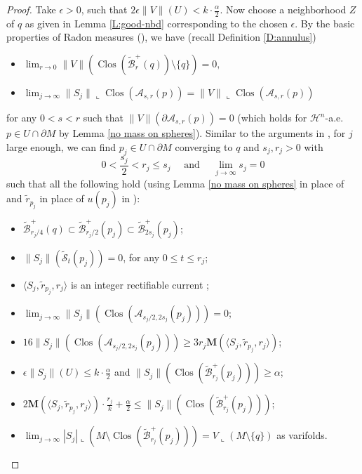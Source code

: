 \documentclass[10pt]{amsart}
\theoremstyle{definition}
\theoremstyle{remark}
\numberwithin{equation}{section}
\newcommand{\al}{\alpha}
\newcommand{\mH}{\mathcal{H}}
\newcommand{\A}{\mathcal{A}}
\newcommand{\lan}{\langle}
\newcommand{\ran}{\rangle}
\newcommand{\lc}{\llcorner}
\newcommand{\ep}{\epsilon}
\newcommand{\M}{\mathbf{M}}
\newcommand{\tA}{\widetilde{A}}
\newcommand{\tB}{\widetilde{B}}
\newcommand{\tBcal}{\widetilde{\mathcal{B}}}
\newcommand{\tScal}{\widetilde{\mathcal{S}}}
\newcommand{\tir}{\widetilde{r}}
\newcommand{\Clos}{\operatorname{Clos}}
\begin{document}
\begin{proof}
Take $\ep>0$, such that $2\ep\|V\|(U)<k \cdot \frac{\al}{2}$. Now choose a neighborhood $Z$ of $q$ as given in Lemma \ref{L:good-nbd} corresponding to the chosen $\ep$. 
By the basic properties of Radon measures (\cite[2.6(2)(d)]{Allard72}), we have (recall Definition \ref{D:annulus})
\begin{itemize}
\item $\lim_{r\rightarrow 0}\|V\| (\Clos(\tBcal^+_r(q)) \setminus\{q\})=0,$
\item $\lim_{j\rightarrow\infty}\|S_j\|\lc \Clos(\A_{s,r}(p))=\|V\|\lc \Clos(\A_{s,r}(p))$
\end{itemize}
 for any $0<s<r$ such that $\|V\| (\partial \A_{s,r}(p))=0$ (which holds for $\mH^n$-a.e. $p \in U \cap \partial M$ by Lemma \ref{no mass on spheres}).
Similar to the arguments in \cite[Lemma 3.7, page 119]{Pitts}, for $j$ large enough, we can find $p_j \in U \cap \partial M$ converging to $q$ and $s_j,r_j>0$ with 
\[ 0<\frac{s_j}{2}<r_j\leq s_j \quad  \text{ and }  \quad \lim_{j\rightarrow\infty}s_j=0 \]
such that all the following hold (using Lemma \ref{no mass on spheres} in place of \cite[Lemma 3.6]{Pitts} and $\tir_{p_j}$ in place of $u(p_j)$ in \cite[page 119]{Pitts}):
\begin{itemize}
\item $\tBcal^+_{r_j/4}(q) \subset \tBcal^+_{r_j/2}(p_j)\subset \tBcal^+_{2s_j}(p_j)$;
\item $\|S_j\| (\tScal_t(p_j))=0$, for any $0\leq t\leq r_j$;
\item $\lan S_j, \tir_{p_j}, r_j\ran$ is an integer rectifiable current \cite[\S 28]{Simon};
\item $\lim_{j\rightarrow\infty}\|S_j\| (\Clos(\A_{s_j/2,2s_j}(p_j)))=0$;
\item $16\|S_j\| (\Clos(\A_{s_j/2,2s_j}(p_j)) )\geq 3 r_j\M (\lan S_j, \tir_{p_j}, r_j\ran)$;
\item $\ep\|S_j\|(U)\leq k \cdot \frac{\al}{2}$  and $\|S_j\|(\Clos(\tBcal^+_{r_j}(p_j)))\geq \al$;
\item $2\M (\lan S_j, \tir_{p_j}, r_j\ran) \cdot \frac{r_j}{k}+\frac{\al}{2}\leq \|S_j\|(\Clos(\tBcal^+_{r_j}(p_j)))$;
\item $\lim_{j\rightarrow\infty}|S_j|\lc (M\setminus \Clos(\tBcal^+_{r_j}(p_j)))=V\lc (M\setminus\{q\})$ as varifolds.
\end{itemize}

\end{proof}
\end{document}
